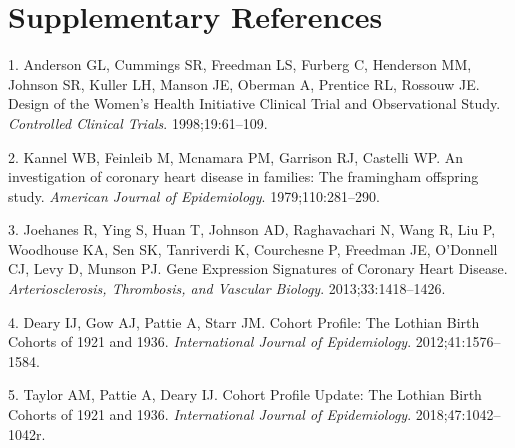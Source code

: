 \documentclass[]{article}
\begin{document}
\newpage

\hypertarget{supplementary-references}{%
\section*{Supplementary References}\label{supplementary-references}}

\hypertarget{refs}{}
\leavevmode\hypertarget{ref-Anderson1998}{}%
1. Anderson GL, Cummings SR, Freedman LS, Furberg C, Henderson MM,
Johnson SR, Kuller LH, Manson JE, Oberman A, Prentice RL, Rossouw JE.
Design of the Women's Health Initiative Clinical Trial and Observational
Study. \emph{Controlled Clinical Trials}. 1998;19:61--109.

\leavevmode\hypertarget{ref-Kannel1979}{}%
2. Kannel WB, Feinleib M, Mcnamara PM, Garrison RJ, Castelli WP. An
investigation of coronary heart disease in families: The framingham
offspring study. \emph{American Journal of Epidemiology}.
1979;110:281--290.

\leavevmode\hypertarget{ref-Joehanes2013}{}%
3. Joehanes R, Ying S, Huan T, Johnson AD, Raghavachari N, Wang R, Liu
P, Woodhouse KA, Sen SK, Tanriverdi K, Courchesne P, Freedman JE,
O'Donnell CJ, Levy D, Munson PJ. Gene Expression Signatures of Coronary
Heart Disease. \emph{Arteriosclerosis, Thrombosis, and Vascular
Biology}. 2013;33:1418--1426.

\leavevmode\hypertarget{ref-Deary2012}{}%
4. Deary IJ, Gow AJ, Pattie A, Starr JM. Cohort Profile: The Lothian
Birth Cohorts of 1921 and 1936. \emph{International Journal of
Epidemiology}. 2012;41:1576--1584.

\leavevmode\hypertarget{ref-Taylor2018}{}%
5. Taylor AM, Pattie A, Deary IJ. Cohort Profile Update: The Lothian
Birth Cohorts of 1921 and 1936. \emph{International Journal of
Epidemiology}. 2018;47:1042--1042r.
\end{document}
